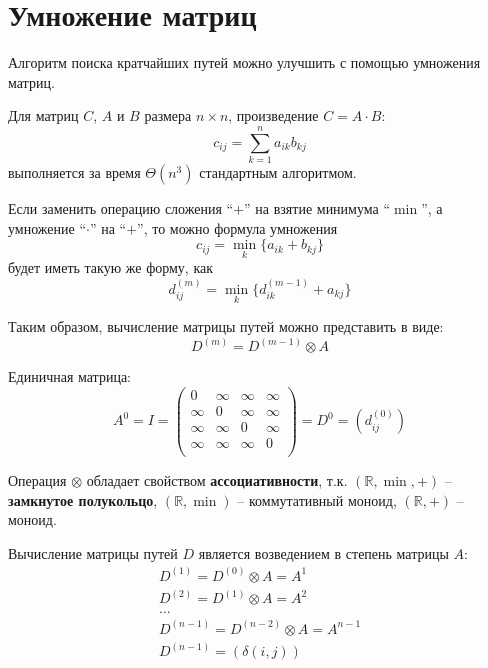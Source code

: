 \documentclass[11pt]{article}
\begin{document}
\section{Умножение матриц}
Алгоритм поиска кратчайших путей можно улучшить с помощью умножения матриц.

Для матриц $C$, $A$ и $B$ размера $n \times n$, произведение $C = A \cdot B$:
\begin{equation*}
  c_{i j} = \sum^n_{k=1}a_{i k}b_{k j}
\end{equation*}
выполняется за время $\Theta(n^3)$ стандартным алгоритмом.

Если заменить операцию сложения ``$+$'' на взятие минимума ``$\min$'', а умножение ``$\cdot$'' на ``$+$'', то можно формула умножения
\begin{equation*}
  c_{i j} = \min_k\{a_{i k} + b_{k j}\}
\end{equation*}
будет иметь такую же форму, как
\begin{equation*}
  d_{i j}^{(m)} = \min_k\{d_{i k}^{(m-1)} + a_{k j}\}
\end{equation*}

Таким образом, вычисление матрицы путей можно представить в виде:
\begin{equation*}
  D^{(m)} = D^{(m-1)} \otimes A
\end{equation*}

Единичная матрица:
\begin{equation*}
  A^0 = I = \left( \begin{smallmatrix} 
    0 & \infty & \infty & \infty \\
    \infty & 0 & \infty & \infty \\
    \infty & \infty & 0 & \infty \\
    \infty & \infty & \infty & 0 \\
  \end{smallmatrix} \right) = D^0 = (d_{i j}^{(0)})
\end{equation*}

Операция $\otimes$ обладает свойством \textbf{ассоциативности}, т.к. $(\mathbb{R}, \min, +)$ -- \textbf{замкнутое полукольцо}, $(\mathbb{R}, \min)$ -- коммутативный моноид, $(\mathbb{R}, +)$ -- моноид.

Вычисление матрицы путей $D$ является возведением в степень матрицы $A$:
\begin{align}
  D^{(1)} = D^{(0)} \otimes A = A^1 \\
  D^{(2)} = D^{(1)} \otimes A = A^2 \\
  \ldots \\
  D^{(n-1)} = D^{(n-2)} \otimes A = A^{n-1} \\
  D^{(n-1)} = (\delta(i, j)) 
\end{align}
\end{document}
